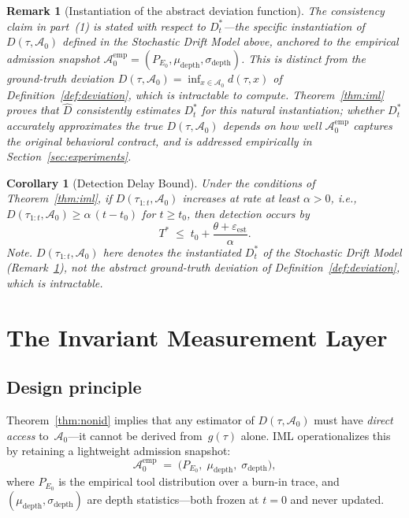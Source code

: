 \documentclass[11pt]{article}
\newtheorem{corollary}[theorem]{Corollary}
\newtheorem{remark}{Remark}[section]
\newcommand{\Azero}{\mathcal{A}_0}
\newcommand{\Dhat}{\widehat{D}}
\begin{document}
\begin{remark}[Instantiation of the abstract deviation function]
\label{rem:dstar}
The consistency claim in part~(1) is stated with respect to
$D_t^*$---the specific instantiation of $D(\tau, \Azero)$ defined in
the Stochastic Drift Model above, anchored to the empirical admission
snapshot $\Azero^{\mathrm{emp}} = (P_{E_0}, \mu_{\mathrm{depth}},
\sigma_{\mathrm{depth}})$.  This is distinct from the ground-truth deviation
$D(\tau, \Azero) = \inf_{x \in \Azero} d(\tau, x)$ of Definition~\ref{def:deviation},
which is intractable to compute.  Theorem~\ref{thm:iml} proves that $\Dhat$
consistently estimates $D_t^*$ for this natural instantiation; whether $D_t^*$
accurately approximates the true $D(\tau, \Azero)$ depends on how well
$\Azero^{\mathrm{emp}}$ captures the original behavioral contract, and is
addressed empirically in Section~\ref{sec:experiments}.
\end{remark}

\begin{corollary}[Detection Delay Bound]
\label{cor:delay}
Under the conditions of Theorem~\ref{thm:iml}, if $D(\tau_{1:t}, \Azero)$
increases at rate at least $\alpha > 0$, i.e.,
$D(\tau_{1:t}, \Azero) \geq \alpha\,(t - t_0)$ for $t \geq t_0$, then
detection occurs by
\[
  T^* \;\leq\; t_0 + \frac{\theta + \varepsilon_{\mathrm{est}}}{\alpha}.
\]
\emph{Note.}  $D(\tau_{1:t}, \Azero)$ here denotes the instantiated $D_t^*$
of the Stochastic Drift Model (Remark~\ref{rem:dstar}), not the abstract
ground-truth deviation of Definition~\ref{def:deviation}, which is intractable.
\end{corollary}

\section{The Invariant Measurement Layer}
\label{sec:iml}

\subsection{Design principle}

Theorem~\ref{thm:nonid} implies that any estimator of $D(\tau,\Azero)$ must
have \emph{direct access} to~$\Azero$---it cannot be derived from~$g(\tau)$
alone.  IML operationalizes this by retaining a lightweight admission
snapshot:
\[
  \Azero^{\mathrm{emp}} \;=\;
  \bigl(P_{E_0},\; \mu_{\mathrm{depth}},\; \sigma_{\mathrm{depth}}\bigr),
\]
where $P_{E_0}$ is the empirical tool distribution over a burn-in trace, and
$(\mu_{\mathrm{depth}}, \sigma_{\mathrm{depth}})$ are depth statistics---both
frozen at $t = 0$ and never updated.
\end{document}
